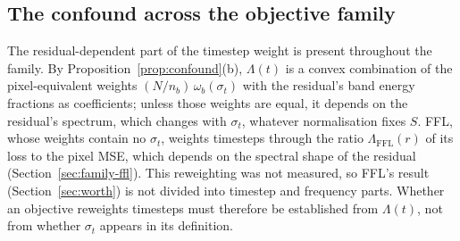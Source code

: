 \subsection{The confound across the objective family}
\label{sec:confound-family}

The residual-dependent part of the timestep weight is present throughout the
family. By Proposition~\ref{prop:confound}(b), $\Lambda(t)$ is a convex
combination of the pixel-equivalent weights $(N/n_b)\,\omega_b(\sigma_t)$
with the residual's band energy fractions as coefficients; unless those
weights are equal, it depends on the residual's spectrum, which changes with
$\sigma_t$, whatever normalisation fixes $S$. FFL, whose weights contain no
$\sigma_t$, weights timesteps through the ratio $\Lambda_{\mathrm{FFL}}(r)$ of
its loss to the pixel MSE, which depends on the spectral shape of the residual
(Section~\ref{sec:family-ffl}). This reweighting was not measured, so FFL's
result (Section~\ref{sec:worth}) is not divided into timestep and frequency
parts.
Whether an objective reweights timesteps must therefore be established from
$\Lambda(t)$, not from whether $\sigma_t$ appears in its definition.
